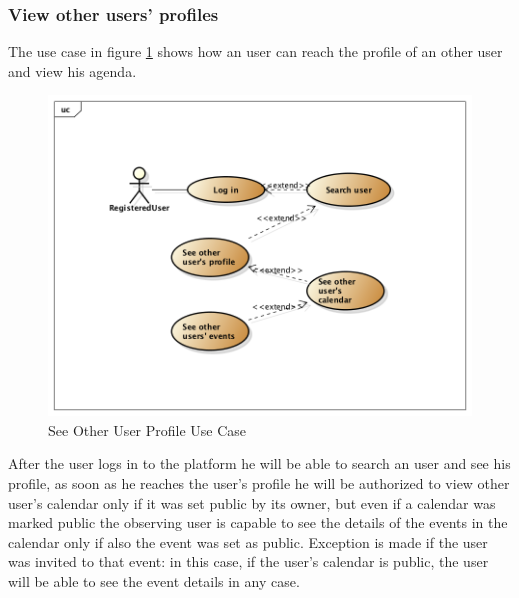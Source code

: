 \subsubsection{View other users' profiles}
The use case in figure \ref{fig:otherprofileusecase} shows how an user can reach the profile of an other user and view his agenda.  \begin{center}
 \begin{figure}[H]
    \includegraphics[width=1\textwidth]{./UMLDiagram/use_case/ViewOtherProfiles/UseCaseDiagram0.png}
    \caption{See Other User Profile Use Case}
     \label{fig:otherprofileusecase}
     \end{figure}
   \end{center}  
After the user logs in to the platform he will be able to search an user and see his profile, as soon as he reaches the user's profile he will be authorized to view other user's calendar only if it was set public by its owner, but even if a calendar was marked public the observing user is capable to see the details of the events in the calendar only if also the event was set as public. Exception is made if the user was invited to that event: in this case, if the user's calendar is public, the user will be able to see the event details in any case.

